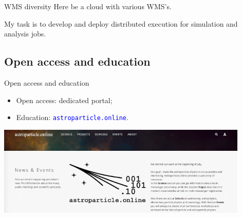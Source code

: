 \documentclass[18pt]{beamer}
\begin{document}
\begin{frame}{WMS diversity}
\Huge
Here be a cloud with various WMS's.

\normalsize
My task is to develop and deploy distributed execution for simulation and analysis jobs.
\end{frame}

\subsection{Open access and education}

\begin{frame}{Open access and education}
\begin{itemize}
\item Open access: dedicated portal;
\item Education: \textcolor{blue}{\texttt{astroparticle.online}}.
\end{itemize}
\begin{center}
  \includegraphics[width=0.9\textwidth]{pics/astro_onl.png}
\end{center}
\end{frame}
\end{document}
